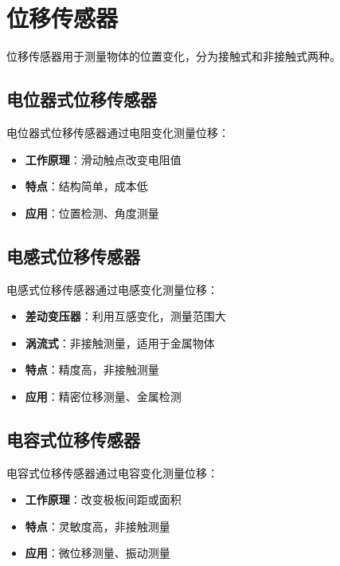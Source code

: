 \documentclass[12pt,UTF8]{ctexbook}
\begin{document}
\section{位移传感器}

位移传感器用于测量物体的位置变化，分为接触式和非接触式两种。

\subsection{电位器式位移传感器}

电位器式位移传感器通过电阻变化测量位移：

\begin{itemize}[leftmargin=2cm]
	\item \textbf{工作原理}：滑动触点改变电阻值
	\item \textbf{特点}：结构简单，成本低
	\item \textbf{应用}：位置检测、角度测量
\end{itemize}

\subsection{电感式位移传感器}

电感式位移传感器通过电感变化测量位移：

\begin{itemize}[leftmargin=2cm]
	\item \textbf{差动变压器}：利用互感变化，测量范围大
	\item \textbf{涡流式}：非接触测量，适用于金属物体
	\item \textbf{特点}：精度高，非接触测量
	\item \textbf{应用}：精密位移测量、金属检测
\end{itemize}

\subsection{电容式位移传感器}

电容式位移传感器通过电容变化测量位移：

\begin{itemize}[leftmargin=2cm]
	\item \textbf{工作原理}：改变极板间距或面积
	\item \textbf{特点}：灵敏度高，非接触测量
	\item \textbf{应用}：微位移测量、振动测量
\end{itemize}
\end{document}
